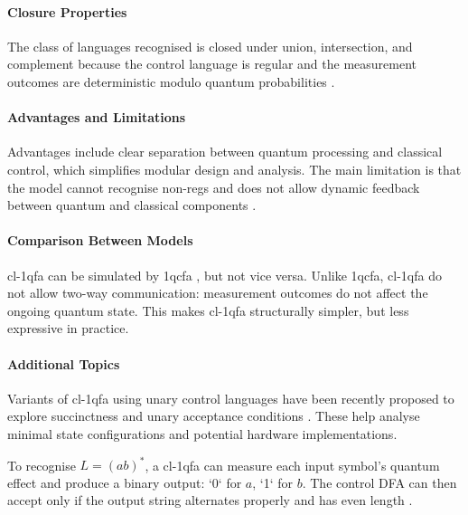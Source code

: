 \paragraph{Closure Properties}  
The class of languages recognised is closed under union, intersection, and complement because the control language is regular and the measurement outcomes are deterministic modulo quantum probabilities \cite{li2015hybrid}.

\paragraph{Advantages and Limitations}  
Advantages include clear separation between quantum processing and classical control, which simplifies modular design and analysis. The main limitation is that the model cannot recognise non-\glspl{reg} and does not allow dynamic feedback between quantum and classical components \cite{li2015hybrid}.

\paragraph{Comparison Between Models}  
\gls{cl-1qfa} can be simulated by \gls{1qcfa} \cite{li2015hybrid}, but not vice versa. Unlike \gls{1qcfa}, \gls{cl-1qfa} do not allow two-way communication: measurement outcomes do not affect the ongoing quantum state. This makes \gls{cl-1qfa} structurally simpler, but less expressive in practice.

\paragraph{Additional Topics}  
Variants of \gls{cl-1qfa} using unary control languages have been recently proposed to explore succinctness and unary acceptance conditions \cite{mereghetti2024unary}. These help analyse minimal state configurations and potential hardware implementations.

\begin{example} 
To recognise $L = (ab)^*$, a \gls{cl-1qfa} can measure each input symbol's quantum effect and produce a binary output: `0` for $a$, `1` for $b$. The control DFA can then accept only if the output string alternates properly and has even length \cite{mereghetti2006quantum}.
\end{example}

\subsubsection{}

